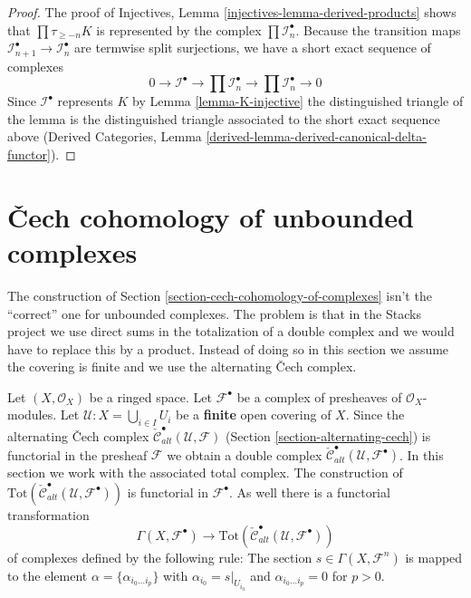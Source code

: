 \begin{proof}
The proof of
Injectives, Lemma \ref{injectives-lemma-derived-products}
shows that $\prod \tau_{\geq -n}K$ is represented by the complex
$\prod \mathcal{I}_n^\bullet$. Because the transition maps
$\mathcal{I}_{n + 1}^\bullet \to \mathcal{I}_n^\bullet$
are termwise split surjections, we have a short exact sequence of
complexes
$$
0 \to \mathcal{I}^\bullet \to
\prod \mathcal{I}_n^\bullet \to \prod \mathcal{I}_n^\bullet \to 0
$$
Since $\mathcal{I}^\bullet$ represents $K$ by
Lemma \ref{lemma-K-injective}
the distinguished triangle of the lemma is the distinguished
triangle associated to the short exact sequence above
(Derived Categories, Lemma
\ref{derived-lemma-derived-canonical-delta-functor}).
\end{proof}














\section{{\v C}ech cohomology of unbounded complexes}
\label{section-cech-cohomology-of-unbounded-complexes}

\noindent
The construction of Section \ref{section-cech-cohomology-of-complexes}
isn't the ``correct'' one for unbounded complexes. The problem is that
in the Stacks project we use direct sums in the totalization of a
double complex and we would have to replace this by a product. Instead
of doing so in this section we assume the covering is finite and
we use the alternating {\v C}ech complex.

\medskip\noindent
Let $(X, \mathcal{O}_X)$ be a ringed space.
Let ${\mathcal F}^\bullet$ be a complex of presheaves of
$\mathcal{O}_X$-modules. Let ${\mathcal U} : X = \bigcup_{i \in I} U_i$
be a {\bf finite} open covering of $X$. Since the alternating
{\v C}ech complex
$\check{\mathcal{C}}_{alt}^\bullet(\mathcal{U}, \mathcal{F})$
(Section \ref{section-alternating-cech})
is functorial in the presheaf $\mathcal{F}$ we obtain a double complex
$\check{\mathcal{C}}^\bullet_{alt}(\mathcal{U}, \mathcal{F}^\bullet)$.
In this section we work with the associated total complex.
The construction of
$\text{Tot}(\check{\mathcal{C}}^\bullet_{alt}({\mathcal U},
{\mathcal F}^\bullet))$
is functorial in ${\mathcal F}^\bullet$. As well there is a functorial
transformation
\begin{equation}
\label{equation-global-sections-to-alternating-cech}
\Gamma(X, {\mathcal F}^\bullet)
\longrightarrow
\text{Tot}(\check{\mathcal{C}}^\bullet_{alt}({\mathcal U},
{\mathcal F}^\bullet))
\end{equation}
of complexes defined by the following rule: The section
$s\in \Gamma(X, {\mathcal F}^n)$
is mapped to the element $\alpha = \{\alpha_{i_0\ldots i_p}\}$
with $\alpha_{i_0} = s|_{U_{i_0}}$ and $\alpha_{i_0\ldots i_p} = 0$
for $p > 0$.

